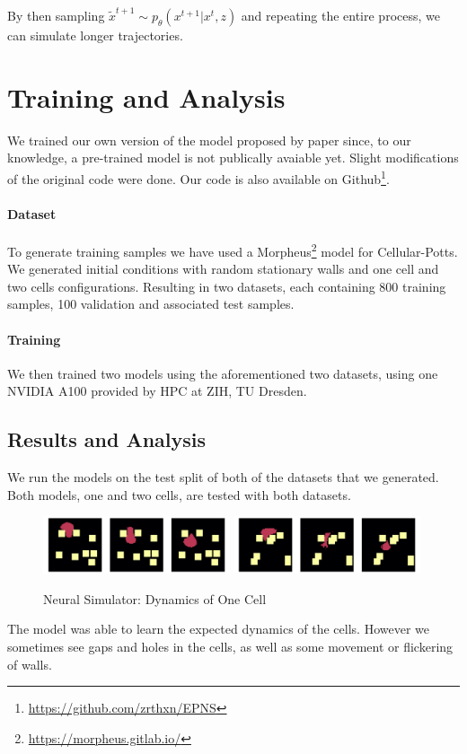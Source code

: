 \documentclass[a4paper,10pt,twocolumn]{article}
\begin{document}
            By then sampling $\tilde{x}^{t+1} \sim p_\theta(x^{t+1}|x^t, z)$ and
            repeating the entire process, we can simulate longer trajectories.


    \section{Training and Analysis}
        We trained our own version of the model proposed by paper since, to our knowledge, 
        a pre-trained model is not publically avaiable yet. Slight modifications of the original code were done. 
        Our code is also available on Github\footnote{\url{https://github.com/zrthxn/EPNS}}.

        \paragraph{Dataset}
        To generate training samples we have used a Morpheus\footnote{\url{https://morpheus.gitlab.io/}}\cite{morpheus} 
        model for Cellular-Potts.
        We generated initial conditions with random stationary walls and one cell and two cells configurations. 
        Resulting in two datasets, each containing 800 training samples, 100 validation and associated test samples.
        
        \paragraph{Training}
        We then trained two models using the aforementioned two datasets, using one NVIDIA A100 
        provided by HPC at ZIH, TU Dresden.

        \subsection{Results and Analysis}
            We run the models on the test split of both of the datasets that we generated.
            Both models, one and two cells, are tested with both datasets.

            \begin{figure}[H]\centering
                \includegraphics[width=0.49\textwidth]{../images/run_40.png}
                \includegraphics[width=0.49\textwidth]{../images/run_32.png}
                \caption{Neural Simulator: Dynamics of One Cell}
            \end{figure}
            The model was able to learn the expected dynamics of the cells.
            However we sometimes see gaps and holes
            in the cells, as well as some movement or flickering of walls.
\end{document}
